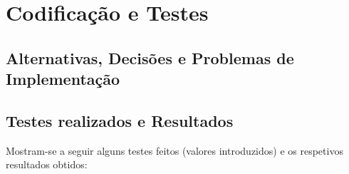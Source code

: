 \chapter{Codificação e Testes}

\section{Alternativas, Decisões e Problemas de Implementação}

\section{Testes realizados e Resultados}
Mostram-se a seguir alguns testes feitos (valores introduzidos) e
os respetivos resultados obtidos:



